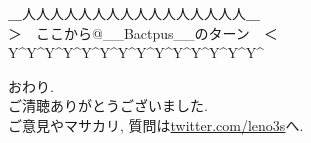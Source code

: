 \documentclass[uplatex, dvipdfmx, unicode]{beamer}
\begin{document}
\begin{frame}
  \centering
  \Large
  ＿人人人人人人人人人人人人人人人人＿ \\
  ＞　ここから@\_\_Bactpus\_\_のターン　＜ \\
  Y\textasciicircum Y\textasciicircum Y\textasciicircum Y\textasciicircum Y\textasciicircum Y\textasciicircum Y\textasciicircum Y\textasciicircum Y\textasciicircum Y\textasciicircum Y\textasciicircum Y\textasciicircum Y\textasciicircum Y\textasciicircum \\
\end{frame}

\begin{frame}
  \centering
  \Large
  おわり. \\
  \normalsize
  ご清聴ありがとうございました. \\
  ご意見やマサカリ, 質問は\url{twitter.com/leno3s}へ.
\end{frame}
\end{document}
